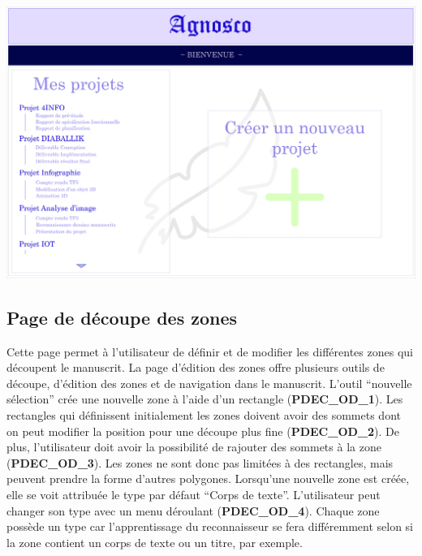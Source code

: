 \paragraph{}
\begin{mdframed}[frametitle={Figure 6 : Accueil de l'application}, innerbottommargin=10]
\begin{center}
\includegraphics[scale=0.05]{ihm1.jpg}
\end{center}
\end{mdframed}

\subsection{Page de découpe des zones}

Cette page permet à l’utilisateur de définir et de modifier les différentes
zones qui découpent le manuscrit. La page d’édition des zones offre
plusieurs outils de découpe, d’édition des zones et de navigation dans le
manuscrit. L’outil “nouvelle sélection” crée une nouvelle zone à l’aide d’un
rectangle (\textbf{PDEC\_OD\_1}). Les rectangles qui définissent initialement
les zones doivent avoir des sommets dont on peut modifier la position pour
une découpe plus fine (\textbf{PDEC\_OD\_2}). De plus, l’utilisateur doit avoir
la possibilité de rajouter des sommets à la zone (\textbf{PDEC\_OD\_3}). Les
zones ne sont donc pas limitées à des rectangles, mais peuvent prendre la forme
d’autres polygones. Lorsqu’une nouvelle zone est créée, elle se voit attribuée
le type par défaut “Corps de texte”. L’utilisateur peut changer son type avec
un menu déroulant (\textbf{PDEC\_OD\_4}). Chaque zone possède un type car
l’apprentissage du reconnaisseur se fera différemment selon si la zone contient
un corps de texte ou un titre, par exemple.

